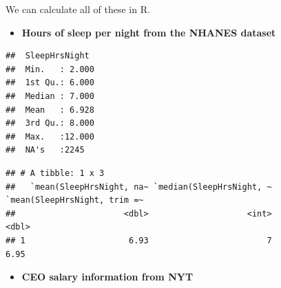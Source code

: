\documentclass[
]{book}
\newenvironment{Shaded}{\begin{snugshade}}{\end{snugshade}}
\newcommand{\CommentTok}[1]{\textcolor[rgb]{0.56,0.35,0.01}{\textit{#1}}}
\newcommand{\DataTypeTok}[1]{\textcolor[rgb]{0.13,0.29,0.53}{#1}}
\newcommand{\FloatTok}[1]{\textcolor[rgb]{0.00,0.00,0.81}{#1}}
\newcommand{\KeywordTok}[1]{\textcolor[rgb]{0.13,0.29,0.53}{\textbf{#1}}}
\newcommand{\NormalTok}[1]{#1}
\newcommand{\OperatorTok}[1]{\textcolor[rgb]{0.81,0.36,0.00}{\textbf{#1}}}
\newcommand{\OtherTok}[1]{\textcolor[rgb]{0.56,0.35,0.01}{#1}}
\newcommand{\StringTok}[1]{\textcolor[rgb]{0.31,0.60,0.02}{#1}}
\providecommand{\tightlist}{%
  \setlength{\itemsep}{0pt}\setlength{\parskip}{0pt}}
\begin{document}
We can calculate all of these in R.

\begin{itemize}
\tightlist
\item
  \textbf{Hours of sleep per night from the NHANES dataset}
\end{itemize}

\begin{Shaded}
\end{Shaded}

\begin{verbatim}
##  SleepHrsNight   
##  Min.   : 2.000  
##  1st Qu.: 6.000  
##  Median : 7.000  
##  Mean   : 6.928  
##  3rd Qu.: 8.000  
##  Max.   :12.000  
##  NA's   :2245
\end{verbatim}

\begin{Shaded}
\end{Shaded}

\begin{verbatim}
## # A tibble: 1 x 3
##   `mean(SleepHrsNight, na~ `median(SleepHrsNight, ~ `mean(SleepHrsNight, trim =~
##                      <dbl>                    <int>                        <dbl>
## 1                     6.93                        7                         6.95
\end{verbatim}

\begin{itemize}
\tightlist
\item
  \textbf{CEO salary information from NYT}
\end{itemize}

\begin{Shaded}
\end{Shaded}
\end{document}
